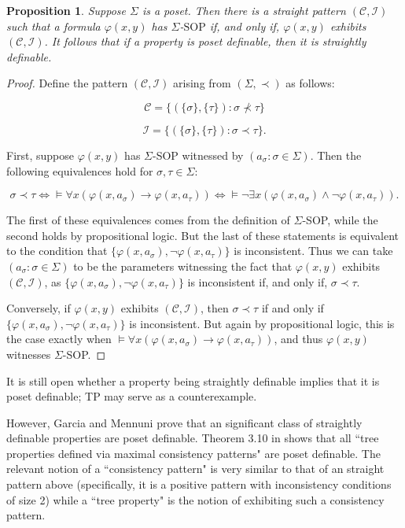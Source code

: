 \documentclass[10pt,a4paper]{amsart}
\newcommand{\calC}{\mathcal{C}}
\newcommand{\calI}{\mathcal{I}}
\newcommand{\vphi}{\varphi}
\newtheorem{proposition}{Proposition}
\begin{document}
\begin{proposition}\label{poset implies straight}
    Suppose $\Sigma$ is a poset. Then there is a straight pattern $(\calC, \calI)$ such that a formula $\vphi(x,y)$ has $\Sigma$-$\mathrm{SOP}$ if, and only if, $\vphi(x,y)$ exhibits $(\calC, \calI)$. It follows that if a property is poset definable, then it is straightly definable.
\end{proposition}

\begin{proof}
    Define the pattern $(\calC,\calI)$ arising from $(\Sigma,\prec)$ as follows: 

    \[\calC=\{(\{\sigma\},\{\tau
    \})\colon \sigma\not\prec\tau\}\]
    
   \[\calI=\{(\{\sigma\},\{\tau\})\colon \sigma\prec\tau\}.\]

First, suppose $\vphi(x,y)$ has $\Sigma$-SOP witnessed by $(a_\sigma\colon \sigma\in \Sigma)$. Then the following equivalences hold for $\sigma,\tau\in\Sigma$:

\[\sigma\prec\tau\iff \models\forall x(\vphi(x,a_\sigma)\to\vphi(x,a_\tau))\iff\models \neg\exists x(\vphi(x, a_\sigma)\land\neg\vphi(x, a_\tau)).\]

The first of these equivalences comes from the definition of $\Sigma$-SOP, while the second holds by propositional logic. But the last of these statements is equivalent to the condition that $\{\vphi(x, a_\sigma),\neg\vphi(x,a_\tau)\}$ is inconsistent. Thus we can take $(a_\sigma\colon \sigma\in \Sigma)$ to be the parameters witnessing the fact that $\vphi(x,y)$ exhibits $(\calC,\calI)$, as  $\{\vphi(x, a_\sigma),\neg\vphi(x,a_\tau)\}$ is inconsistent if, and only if, $\sigma\prec\tau$. 

Conversely, if $\vphi(x,y)$ exhibits $(\calC,\calI)$, then $\sigma\prec\tau$ if and only if $\{\vphi(x, a_\sigma),\neg\vphi(x,a_\tau)\}$ is inconsistent. But again by propositional logic, this is the case exactly when $\models\forall x(\vphi(x,a_\sigma)\to\vphi(x,a_\tau))$, and thus $\vphi(x,y)$ witnesses $\Sigma$-SOP.
   
\end{proof}

It is still open whether a property being straightly definable implies that it is poset definable; TP may serve as a counterexample.

However, Garcia and Mennuni prove that an significant class of straightly definable properties are poset definable. Theorem 3.10 in \cite{garcia2022model} shows that all ``tree properties defined via maximal consistency patterns" are poset definable. The relevant notion of a ``consistency pattern" is very similar to that of an straight pattern above (specifically, it is a positive pattern with inconsistency conditions of size 2) while a   ``tree property" is the notion of exhibiting such a consistency pattern.
\end{document}
